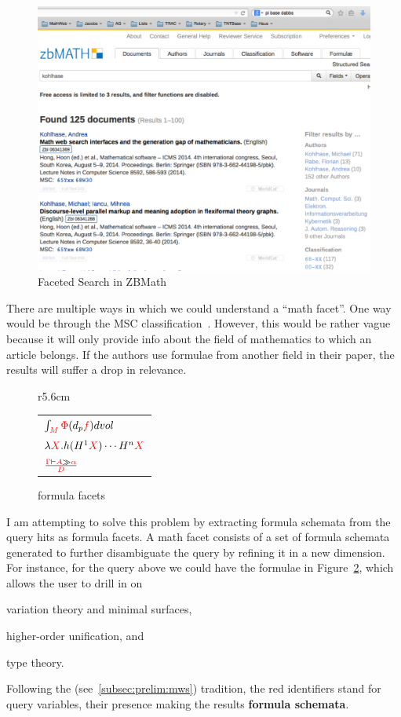 \begin{figure}[ht]\centering
\includegraphics[width=12.7cm]{img/faceted-search.pdf}
\caption{Faceted Search in ZBMath}\label{fig:zbFaceted}
\end{figure}

There are multiple ways in which we could understand a ``math facet''.  One way
would be through the MSC classification~\cite{MSC-SKOS}.  However, this would
be rather vague because it will only provide info about the field of
mathematics to which an article belongs. If the authors use formulae from
another field in their paper, the results will suffer a drop in relevance.

\begin{figure}r{5.6cm}\vspace*{-1em}
\begin{tabular}{l}
$\int_{\textcolor{red}{M}}{\textcolor{red}{\Phi}(d_p\textcolor{red}{f}) dvol}$\\[1ex]
$\lambda{\textcolor{red}{X}}.h(H^1\textcolor{red}{X})\cdots{H^n\textcolor{red}{X}}$\\[1ex]
$\frac{\textcolor{red}{\Gamma}\vdash\textcolor{red}{A}\gg\textcolor{red}{\alpha}}{\textcolor{red}{D}}$
\end{tabular}\vspace*{-.5em}
\caption{formula facets}\label{fig:formula-facets}\vspace*{-1em}
\end{figure}

I am attempting to solve this problem by extracting formula schemata from the
query hits as formula facets. A math facet consists of a set of formula
schemata generated to further disambiguate the query by refining it in a new
dimension.  For instance, for the query above we could have the formulae in
Figure~\ref{fig:formula-facets}, which allows the user to drill in on
\begin{inparaenum}[\em i\rm)]
\item variation theory and minimal surfaces,
\item higher-order unification, and
\item type theory.
\end{inparaenum}
Following the \MWS (see~\ref{subsec:prelim:mws}) tradition, the red identifiers
stand for query variables, their presence making the results \textbf{formula
schemata}.

